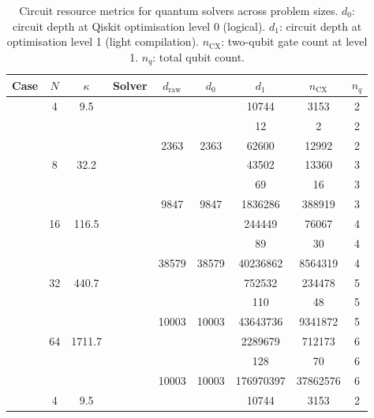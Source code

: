 \begin{table}[htbp]
  \centering
  \caption{Circuit resource metrics for quantum solvers across problem sizes. $d_0$: circuit depth at Qiskit optimisation level 0 (logical). $d_1$: circuit depth at optimisation level 1 (light compilation). $n_\mathrm{CX}$: two-qubit gate count at level 1. $n_q$: total qubit count.}
  \label{tab:circuit_resources}
  \begin{tabular}{l S[table-format=3.0] S[table-format=4.1] l S[table-format=6.0] S[table-format=6.0] S[table-format=6.0] S[table-format=5.0] S[table-format=2.0]}
    \toprule
    {Case} & {$N$} & {$\kappa$} & {Solver} & {$d_\mathrm{raw}$} & {$d_0$} & {$d_1$} & {$n_\mathrm{CX}$} & {$n_q$} \\
    \midrule
     & 4 & 9.5 &  & {\text{---}} & {\text{---}} & 10744 & 3153 & 2 \\
     &  &  &  & {\text{---}} & {\text{---}} & 12 & 2 & 2 \\
     &  &  &  & 2363 & 2363 & 62600 & 12992 & 2 \\
     & 8 & 32.2 &  & {\text{---}} & {\text{---}} & 43502 & 13360 & 3 \\
     &  &  &  & {\text{---}} & {\text{---}} & 69 & 16 & 3 \\
     &  &  &  & 9847 & 9847 & 1836286 & 388919 & 3 \\
     & 16 & 116.5 &  & {\text{---}} & {\text{---}} & 244449 & 76067 & 4 \\
     &  &  &  & {\text{---}} & {\text{---}} & 89 & 30 & 4 \\
     &  &  &  & 38579 & 38579 & 40236862 & 8564319 & 4 \\
     & 32 & 440.7 &  & {\text{---}} & {\text{---}} & 752532 & 234478 & 5 \\
     &  &  &  & {\text{---}} & {\text{---}} & 110 & 48 & 5 \\
     &  &  &  & 10003 & 10003 & 43643736 & 9341872 & 5 \\
     & 64 & 1711.7 &  & {\text{---}} & {\text{---}} & 2289679 & 712173 & 6 \\
     &  &  &  & {\text{---}} & {\text{---}} & 128 & 70 & 6 \\
     &  &  &  & 10003 & 10003 & 176970397 & 37862576 & 6 \\
    \midrule
     & 4 & 9.5 &  & {\text{---}} & {\text{---}} & 10744 & 3153 & 2 \\

\end{tabular}
\end{table}
